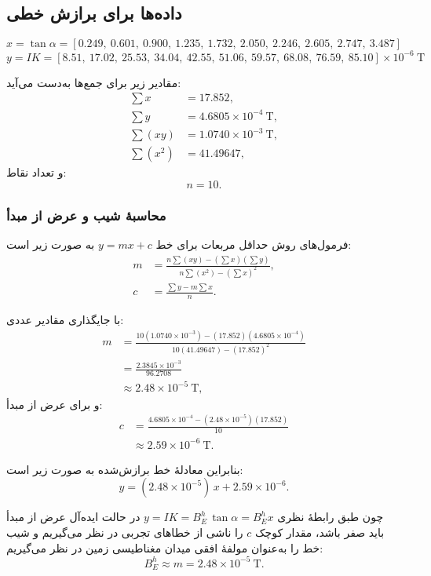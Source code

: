 \documentclass[a4paper, 11pt]{article}
\begin{document}
\subsection{داده‌ها برای برازش خطی}

\[
x = \tan\alpha = [0.249,\ 0.601,\ 0.900,\ 1.235,\ 1.732,\ 2.050,\ 2.246,\ 2.605,\ 2.747,\ 3.487]
\]
\[
y = IK = [8.51,\ 17.02,\ 25.53,\ 34.04,\ 42.55,\ 51.06,\ 59.57,\ 68.08,\ 76.59,\ 85.10]\times 10^{-6}\ \mathrm{T}
\]

مقادیر زیر برای جمع‌ها به‌دست می‌آید:
\begin{align}
\sum x &= 17.852, \\
\sum y &= 4.6805\times 10^{-4}\ \mathrm{T}, \\
\sum(xy) &= 1.0740\times 10^{-3}\ \mathrm{T}, \\
\sum(x^2) &= 41.49647,
\end{align}
و تعداد نقاط:
\[
n = 10.
\]

\subsubsection{محاسبهٔ شیب و عرض از مبدأ}

فرمول‌های روش حداقل مربعات برای خط
\(y = mx + c\)
به صورت زیر است:
\begin{align}
m &= \frac{n\sum(xy) - (\sum x)(\sum y)}{n\sum(x^2) - (\sum x)^2}, \\
c &= \frac{\sum y - m\sum x}{n}.
\end{align}

با جایگذاری مقادیر عددی:
\begin{align}
m &= 
\frac{10(1.0740\times 10^{-3}) - (17.852)(4.6805\times 10^{-4})}
     {10(41.49647) - (17.852)^2} \\[4pt]
  &=
\frac{2.3845\times 10^{-3}}{96.2708} \\[4pt]
  &\approx 2.48\times 10^{-5}\ \mathrm{T},
\end{align}
و برای عرض از مبدأ:
\begin{align}
c &= \frac{4.6805\times 10^{-4} - (2.48\times 10^{-5})(17.852)}{10} \\[4pt]
  &\approx 2.59\times 10^{-6}\ \mathrm{T}.
\end{align}

بنابراین معادلهٔ خط برازش‌شده به صورت زیر است:
\begin{equation}
y = (2.48\times 10^{-5})\,x + 2.59\times 10^{-6}.
\end{equation}

چون طبق رابطهٔ نظری
\(
y = IK = B_E^{h}\,\tan\alpha = B_E^{h} x
\)
در حالت ایده‌آل عرض از مبدأ باید صفر باشد، مقدار کوچک \(c\) را ناشی از خطاهای تجربی در نظر می‌گیریم و شیب خط را به‌عنوان مولفهٔ افقی میدان مغناطیسی زمین در نظر می‌گیریم:
\begin{equation}
B_E^{h} \approx m = 2.48\times 10^{-5}\ \mathrm{T}.
\end{equation}
\end{document}
